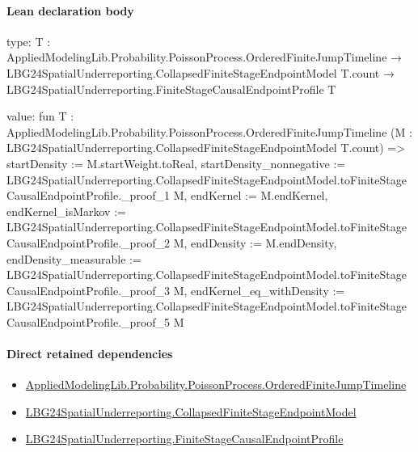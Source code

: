 \documentclass[10pt]{article}
\begin{document}
\paragraph{Lean declaration body}
\begin{ReviewVerbatim}
type:
{T : AppliedModelingLib.Probability.PoissonProcess.OrderedFiniteJumpTimeline} →
  LBG24SpatialUnderreporting.CollapsedFiniteStageEndpointModel T.count →
    LBG24SpatialUnderreporting.FiniteStageCausalEndpointProfile T

value:
fun {T : AppliedModelingLib.Probability.PoissonProcess.OrderedFiniteJumpTimeline}
    (M : LBG24SpatialUnderreporting.CollapsedFiniteStageEndpointModel T.count) =>
  { startDensity := M.startWeight.toReal,
    startDensity_nonnegative :=
      LBG24SpatialUnderreporting.CollapsedFiniteStageEndpointModel.toFiniteStageCausalEndpointProfile._proof_1 M,
    endKernel := M.endKernel,
    endKernel_isMarkov :=
      LBG24SpatialUnderreporting.CollapsedFiniteStageEndpointModel.toFiniteStageCausalEndpointProfile._proof_2 M,
    endDensity := M.endDensity,
    endDensity_measurable :=
      LBG24SpatialUnderreporting.CollapsedFiniteStageEndpointModel.toFiniteStageCausalEndpointProfile._proof_3 M,
    endKernel_eq_withDensity :=
      LBG24SpatialUnderreporting.CollapsedFiniteStageEndpointModel.toFiniteStageCausalEndpointProfile._proof_5 M }
\end{ReviewVerbatim}

\paragraph{Direct retained dependencies}
\begin{itemize}\raggedright
\item \hyperlink{governing-declaration-f690c3c90ba9b3a6}{Applied\allowbreak{}Modeling\allowbreak{}Lib.\allowbreak{}Probability.\allowbreak{}Poisson\allowbreak{}Process.\allowbreak{}Ordered\allowbreak{}Finite\allowbreak{}Jump\allowbreak{}Timeline}
\item \hyperlink{governing-declaration-c8193abaae633e0a}{LBG24\allowbreak{}Spatial\allowbreak{}Underreporting.\allowbreak{}Collapsed\allowbreak{}Finite\allowbreak{}Stage\allowbreak{}Endpoint\allowbreak{}Model}
\item \hyperlink{governing-declaration-8b226869ded20af9}{LBG24\allowbreak{}Spatial\allowbreak{}Underreporting.\allowbreak{}Finite\allowbreak{}Stage\allowbreak{}Causal\allowbreak{}Endpoint\allowbreak{}Profile}
\end{itemize}
\hypertarget{governing-declaration-483f25a71e02f0df}{}
\end{document}
